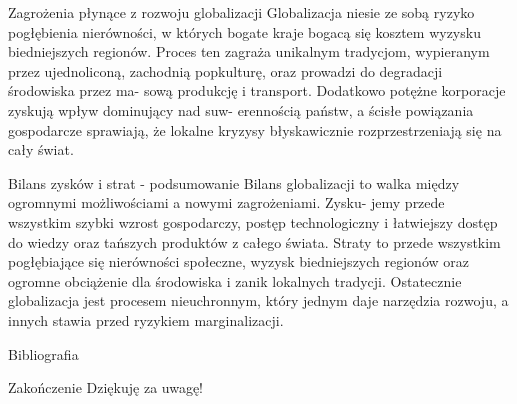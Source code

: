 \documentclass[a4paper]{beamer}
\begin{document}
\begin{frame}{Zagrożenia płynące z rozwoju globalizacji}
    Globalizacja niesie ze sobą ryzyko pogłębienia nierówności, w których bogate kraje bogacą się
    kosztem wyzysku biedniejszych regionów. Proces ten zagraża unikalnym tradycjom, wypieranym
    przez ujednoliconą, zachodnią popkulturę, oraz prowadzi do degradacji środowiska przez ma-
    sową produkcję i transport. Dodatkowo potężne korporacje zyskują wpływ dominujący nad suw-
    erennością państw, a ścisłe powiązania gospodarcze sprawiają, że lokalne kryzysy błyskawicznie
    rozprzestrzeniają się na cały świat.
\end{frame}

\begin{frame}{Bilans zysków i strat - podsumowanie}
    Bilans globalizacji to walka między ogromnymi możliwościami a nowymi zagrożeniami. Zysku-
    jemy przede wszystkim szybki wzrost gospodarczy, postęp technologiczny i łatwiejszy dostęp do
    wiedzy oraz tańszych produktów z całego świata. Straty to przede wszystkim pogłębiające się
    nierówności społeczne, wyzysk biedniejszych regionów oraz ogromne obciążenie dla środowiska i
    zanik lokalnych tradycji. Ostatecznie globalizacja jest procesem nieuchronnym, który jednym daje
    narzędzia rozwoju, a innych stawia przed ryzykiem marginalizacji.
\end{frame}

\nocite{*}
\begin{frame}[allowframebreaks]{Bibliografia}
    \printbibliography
\end{frame}

\begin{frame}{Zakończenie}
    Dziękuję za uwagę!
\end{frame}
\end{document}
